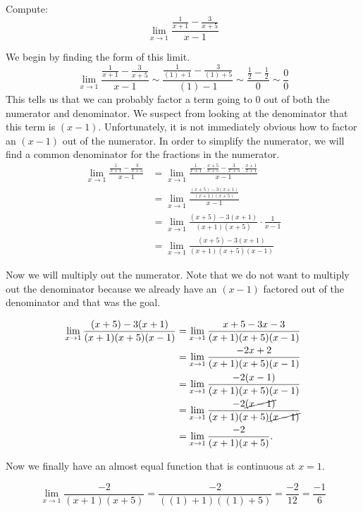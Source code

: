 \documentclass{ximera}
\begin{document}
\begin{example}
  Compute:
  \[
  \lim_{x\to 1} \frac{\frac{1}{x+1}-\frac{3}{x+5}}{x-1}
  \]
\begin{explanation}
  We begin by finding the form of this limit.
  \[
  \lim_{x\to 1} \frac{\frac{1}{x+1}-\frac{3}{x+5}}{x-1} \sim
  \frac{\frac{1}{(1)+1}-\frac{3}{(1)+5}}{(1)-1} \sim
  \frac{\frac{1}{2}-\frac{1}{2}}{0} \sim \frac{0}{0}
  \]
This tells us that we can probably factor a term going to $0$ out of
both the numerator and denominator.  We suspect from looking at the
denominator that this term is $(x-1)$.  Unfortunately, it is not
immediately obvious how to factor an $(x-1)$ out of the numerator.  In
order to simplify the numerator, we will find a common denominator for
the fractions in the numerator.
\begin{align*}
\lim_{x\to 1} \frac{\frac{1}{x+1}-\frac{3}{x+5}}{x-1}  &= \lim_{x\to 1} \frac{\frac{1}{x+1} \cdot \frac{x+5}{x+5}-\frac{3}{x+5} \cdot \frac{x+1}{x+1}}{x-1}\\
&= \lim_{x\to 1} \frac{\frac{(x+5)-3(x+1)}{(x+1)(x+5)}}{x-1}\\
&= \lim_{x\to 1}\frac{(x+5)-3(x+1)}{(x+1)(x+5)} \cdot \frac{1}{x-1}\\
&= \lim_{x\to 1}\frac{(x+5)-3(x+1)}{(x+1)(x+5)(x-1)}
\end{align*}

Now we will multiply out the numerator.  Note that we do not want to
multiply out the denominator because we already have an $(x-1)$
factored out of the denominator and that was the goal.

\begin{align*}
\lim_{x\to 1}\frac{(x+5)-3(x+1)}{(x+1)(x+5)(x-1)} &= \lim_{x\to 1}\frac{x+5-3x-3}{(x+1)(x+5)(x-1)} \\
&= \lim_{x\to 1}\frac{-2x+2}{(x+1)(x+5)(x-1)}\\
&= \lim_{x\to 1}\frac{-2(x-1)}{(x+1)(x+5)(x-1)}\\
&= \lim_{x\to 1}\frac{-2\cancel{(x-1)}}{(x+1)(x+5)\cancel{(x-1)}}\\
&= \lim_{x\to 1}\frac{-2}{(x+1)(x+5)}.
\end{align*}
  
Now we finally have an almost equal function that is continuous at
$x=1$.

\[
\lim_{x\to 1}\frac{-2}{(x+1)(x+5)} = \frac{-2}{((1)+1)((1)+5)} = \frac{-2}{12} = \frac{-1}{6}
\]
\end{explanation}
\end{example}
\end{document}
